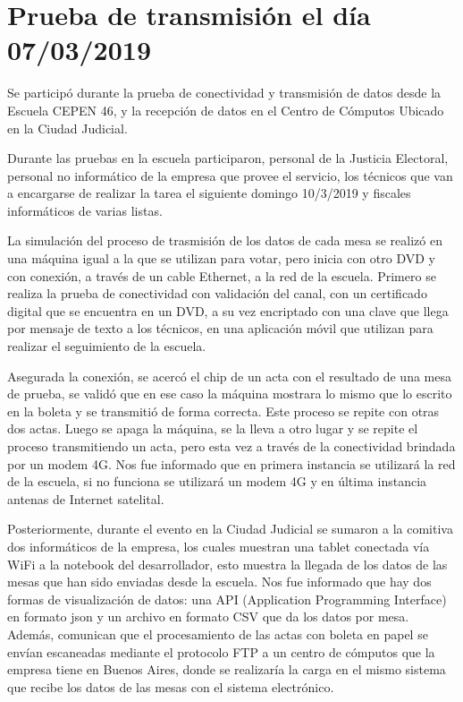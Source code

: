 \section{Prueba de transmisión el día 07/03/2019}
Se participó durante la prueba de conectividad y transmisión de datos desde la Escuela CEPEN 46, y la recepción de datos en el Centro de Cómputos Ubicado en la Ciudad Judicial.

Durante las pruebas en la escuela participaron, personal de la Justicia Electoral, personal no informático de la empresa que provee el servicio, los técnicos que van a encargarse de realizar la tarea el siguiente domingo 10/3/2019 y fiscales informáticos de varias listas.

La simulación del proceso de trasmisión de los datos de cada mesa se realizó en una máquina igual a la que se utilizan para votar, pero inicia con otro DVD y con conexión, a través de un cable Ethernet, a la red de la escuela. Primero se realiza la prueba de conectividad con validación del canal, con un certificado digital que se encuentra en un DVD, a su vez encriptado con una clave que llega por mensaje de texto a los técnicos, en una aplicación móvil que utilizan para realizar el seguimiento de la escuela.

Asegurada la conexión, se acercó el chip de un acta con el resultado de una mesa de prueba, se validó que en ese caso la máquina mostrara lo mismo que lo escrito en la boleta y se transmitió de forma correcta. Este proceso se repite con otras dos actas. Luego se apaga la máquina, se la lleva a otro lugar y se repite el proceso transmitiendo un acta, pero esta vez a través de la conectividad brindada por un modem 4G.
Nos fue informado que en primera instancia se utilizará la red de la escuela, si no funciona se utilizará un modem 4G y en última instancia antenas de Internet satelital.

Posteriormente, durante el evento en la Ciudad Judicial se sumaron a la comitiva dos informáticos de la empresa, los cuales muestran una tablet conectada vía WiFi a la notebook del desarrollador, esto muestra la llegada de los datos de las mesas que han sido enviadas desde la escuela. Nos fue informado que hay dos formas de visualización de datos: una API (Application Programming Interface) en formato json y un archivo en formato CSV que da los datos por mesa. Además, comunican que el procesamiento de las actas con boleta en papel se envían escaneadas mediante el protocolo FTP a un centro de cómputos que la empresa tiene en Buenos Aires, donde se realizaría la carga en el mismo sistema que recibe los datos de las mesas con el sistema electrónico.

